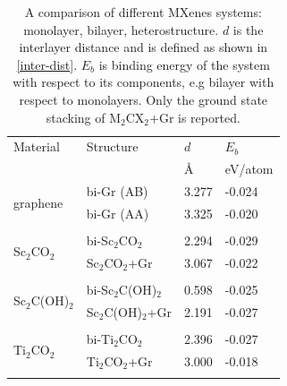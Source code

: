 \begin{table}[htb]
\centering
\caption{A comparison of different MXenes systems: monolayer, bilayer, heterostructure. $d$ is the interlayer distance and is defined as shown in \autoref{inter-dist}. $E_b$ is binding energy of the system with respect to its components, e.g bilayer with respect to monolayers. Only the ground state stacking of M$_2$CX$_2$+Gr is reported.} 
\label{tableI}
\begin{tabularx}{0.8\linewidth}{XXXX}
\hline
Material      & Structure                         & $d$               & $E_b$               \\
              &                                    & \AA                & eV/atom \\ \hline
\multirow{2}{*}{graphene}      & bi-Gr (AB)                                               & 3.277                    & -0.024                        \\
              & bi-Gr (AA)                                                & 3.325                    & -0.020                         \\ \multicolumn{4}{c}{}\\
\multirow{2}{*}{Sc$_2$CO$_2$}    & bi-Sc$_2$CO$_2$                                                   & 2.294                 & -0.029                         \\
              & Sc$_2$CO$_2$+Gr                                                   & 3.067                   & -0.022                         \\
\multicolumn{4}{c}{}\\              
\multirow{2}{*}{Sc$_2$C(OH)$_2$} & bi-Sc$_2$C(OH)$_2$                                                   & 0.598                  & -0.025                         \\
              & Sc$_2$C(OH)$_2$+Gr                                                     & 2.191                  & -0.027                         \\
\multicolumn{4}{c}{}\\              
\multirow{2}{*}{Ti$_2$CO$_2$}    & bi-Ti$_2$CO$_2$                                                & 2.396                   & -0.027                         \\
              & Ti$_2$CO$_2$+Gr                                                   & 3.000                    & -0.018                         \\
\multicolumn{4}{c}{}\\              

\end{tabularx}
\end{table}
